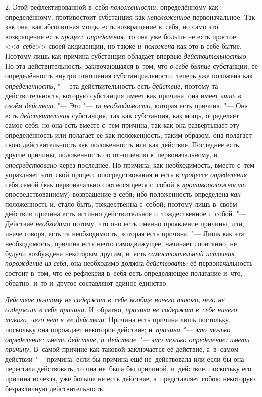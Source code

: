 2. Этой рефлектированной в~себя {\em положенности,}
определённому как определённому, противостоит субстанция как
{\em неположенное} первоначальное. Так как она, как
абсолютная мощь, есть возвращение в~себя, но само это возвращение есть
{\em процесс определения,} то она уже больше не есть
простое <<{\em в~себе}>> своей акциденции, но также
{\em и~положена} как это в-себе-бытие. Поэтому лишь как
причина субстанция обладает впервые
{\em действительностью}. Но эта действительность,
заключающаяся в~том, что {\em в-себе-бытие} субстанции,
её определённость внутри отношения субстанциальности, теперь уже положена
как {\em определённость,} "--- эта действительность есть
{\em действие;} поэтому та действительность, которую
субстанция имеет как причина, она имеет {\em лишь в
своём действии}. "--- Это "--- та {\em необходимость,}
которая есть причина. "--- Она есть {\em действительная}
субстанция, так как субстанция, как мощь, определяет самое себя; но она
есть вместе с~тем причина, так как она развёртывает эту определённость или
полагает её как положенность; таким образом, она полагает свою
действительность как положенность или как действие. Последнее есть другое
причины, положенность по отношению к~первоначальному, и
{\em опосредствовано} через последнее. Но причина, как
необходимость, вместе с~тем упраздняет этот свой процесс опосредствования и
есть в {\em процессе определения} себя самой (как
первоначально соотносящееся с~собой в
{\em противоположность} опосредствованному) возвращение
в себя; ибо положенность определена {\em как}
положенность и, стало быть, тождественна с~собой; поэтому лишь в~своём
действии причина есть истинно действительное и~тождественное с~собой. "---
Действие {\em необходимо} потому, что оно есть именно
проявление причины, или, иначе говоря, есть та необходимость, которая есть
причина. "--- Лишь как эта необходимость, причина есть нечто самодвижущее,
начинает спонтанно, не будучи возбуждена некоторым другим, и~есть
{\em самостоятельный источник, порождение из себя;} она
необходимо должна {\em действовать;} её
первоначальность состоит в~том, что её рефлексия в~себя есть определяющее
полагание и~что, обратно, и~то и~другое составляют единое единство.

{\em Действие поэтому не содержит в~себе вообще ничего такого, чего не содержит
в себе причина.} И~обратно, {\em причина не содержит в~себе ничего такого, чего
нет в~её действии}. Причина есть причина лишь постольку, поскольку она
порождает некоторое действие; и~{\em причина "--- это только определение:
иметь действие, а~действие "--- это только определение: иметь причину.}
В~самой причине как таковой заключается её действие, а~в~самом действии "---
причина; если бы причина ещё не~действовала или если бы она перестала
действовать, то она не~была бы причиной, и~действие, поскольку его причина
исчезла, уже больше не есть действие, а~представляет собою некоторую
безразличную действительность.

